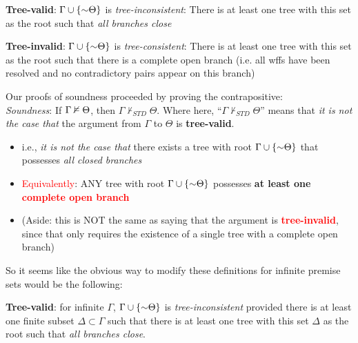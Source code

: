 \documentclass[12pt]{memoir}
\begin{document}
\begin{enumerate}[1.)]
\textbf{Tree-valid}: $\Gamma \cup \{\enot \Theta\}$ is \emph{tree-inconsistent}: There is at least one tree with this set as the root such that \emph{all branches close}

\textbf{Tree-invalid}: $\Gamma \cup \{\enot \Theta\}$ is \emph{tree-consistent}: There is at least one tree with this set as the root such that there is a complete open branch (i.e. all wffs have been resolved and no contradictory pairs appear on this branch)

Our proofs of soundness proceeded by proving the contrapositive: \\ \textit{Soundness}: If $\Gamma \nvDash \Theta$, then $\Gamma \nvdash_{STD} \Theta$. Where here, ``$\Gamma \nvdash_{STD} \Theta$'' means that \textit{it is not the case that} the argument from $\Gamma$ to $\Theta$ is  \textbf{tree-valid}. 

\begin{itemize}

\item i.e., \textit{it is not the case that} there exists a tree with root $\Gamma \cup \{\enot \Theta \}$ that possesses \emph{all closed branches}

\item \textcolor{red}{Equivalently}: ANY tree with root $\Gamma \cup \{\enot \Theta \}$ possesses \textbf{at least one \textcolor{red}{complete open branch}}

\item (Aside: this is NOT the same as saying that the argument is \textcolor{red}{\textbf{tree-invalid}}, since that only requires the existence of a single tree with a complete open branch) 



\end{itemize}

So it seems like the obvious way to modify these definitions for infinite premise sets would be the following: 

\textbf{Tree-valid}: for infinite $\Gamma$, $\Gamma \cup \{\enot \Theta\}$ is \emph{tree-inconsistent} provided there is at least one finite subset $\Delta \subset \Gamma$ such that there is at least one tree with this set $\Delta $ as the root such that \emph{all branches close}. 


\end{enumerate}
\end{document}
